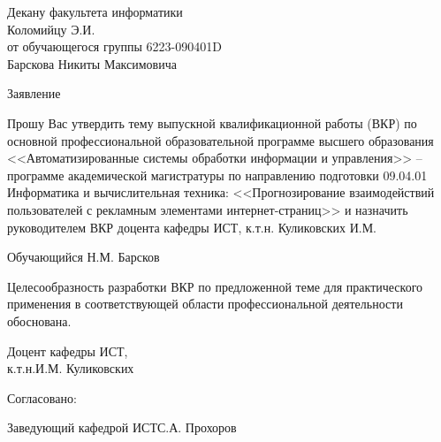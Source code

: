 \documentclass[a4paper, 14pt]{extreport}
\begin{document}
    \thispagestyle{empty}
    \begin{flushright}
        \begin{minipage}[]{0.55\textwidth}
            \noindent Декану факультета информатики \\
            Коломийцу Э.И. \\
            от обучающегося группы \mbox{6223-090401D} \\
            Барскова Никиты Максимовича
        \end{minipage}
    \end{flushright}
    \vspace{42pt}
    \begin{center}
        Заявление
    \end{center}

    Прошу Вас утвердить тему выпускной квалификационной работы (ВКР) по основной профессиональной образовательной
    программе высшего образования <<Автоматизированные системы обработки информации и управления>> -- программе
    академической магистратуры по направлению подготовки 09.04.01 Информатика и вычислительная техника:
    <<Прогнозирование взаимодействий пользователей с рекламным элементами интернет-страниц>>
    и назначить руководителем ВКР доцента кафедры ИСТ, к.т.н. Куликовских И.М.

    \vspace{14pt}
    \noindent Обучающийся \hfill Н.М. Барсков

    \vspace{28pt}

    \noindent Целесообразность разработки ВКР по предложенной теме для практического применения в соответствующей
    области профессиональной деятельности обоснована.

    \vspace{14pt}

    \noindent Доцент кафедры ИСТ,\\ к.т.н.\hfill И.М. Куликовских

    \vspace{14pt}

    \noindent Согласовано:

    \vspace{14pt}

    \noindent Заведующий кафедрой ИСТ\hfill С.А. Прохоров
\end{document}
